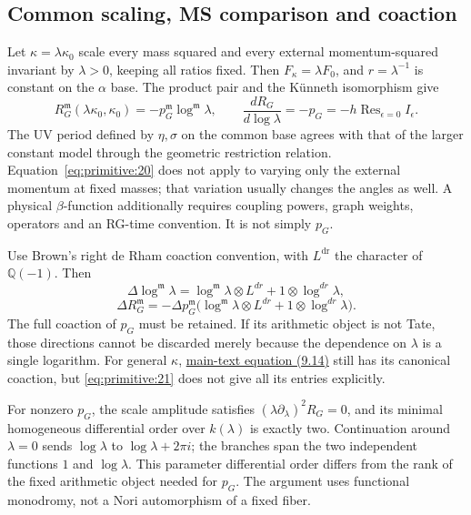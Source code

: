\documentclass[11pt,a4paper,oneside]{article}
\theoremstyle{plain}
\theoremstyle{definition}
\theoremstyle{remark}
\numberwithin{equation}{section}
\newcommand{\otherref}[2]{\href{#1.pdf}{#2}}
\begin{document}
\subsection{Common scaling, MS comparison and coaction}\label{sec:primitive:8}
Let \(\kappa=\lambda\kappa_0\) scale every mass squared and every external momentum-squared invariant by \(\lambda>0\), keeping all ratios fixed. Then \(F_\kappa=\lambda F_0\), and \(r=\lambda^{-1}\) is constant on the \(\alpha\) base. The product pair and the K\"unneth isomorphism give
\begin{equation}
R_G^{\mathfrak m}(\lambda\kappa_0,\kappa_0)
                       =-p_G^{\mathfrak m}\log^{\mathfrak m}\lambda,
 \qquad \frac{dR_G}{d\log\lambda}=-p_G
                         =-h\operatorname{Res}_{\epsilon=0}I_\epsilon.      \label{eq:primitive:20}
\end{equation}
The UV period defined by \(\eta,\sigma\) on the common base agrees with that of the larger constant model through the geometric restriction relation. Equation~\eqref{eq:primitive:20} does not apply to varying only the external momentum at fixed masses; that variation usually changes the angles as well. A physical \(\beta\)-function additionally requires coupling powers, graph weights, operators and an RG-time convention. It is not simply \(p_G\).

Use Brown's right de Rham coaction convention\cite{brownperiods}, with \(L^{\mathrm{dr}}\) the character of $\mathbb Q(-1)$. Then
\begin{equation}
\Delta\log^{\mathfrak m}\lambda
   =\log^{\mathfrak m}\lambda\otimes L^{dr}
                         +1\otimes\log^{dr}\lambda,
\end{equation}
\begin{equation}
\Delta R_G^{\mathfrak m}
  =-\Delta p_G^{\mathfrak m}
       \big(\log^{\mathfrak m}\lambda\otimes L^{dr}
                              +1\otimes\log^{dr}\lambda\big).              \label{eq:primitive:21}
\end{equation}
The full coaction of \(p_G\) must be retained. If its arithmetic object is not Tate, those directions cannot be discarded merely because the dependence on \(\lambda\) is a single logarithm. For general \(\kappa\), \otherref{feynman_periods_long_paper_en}{main-text equation (9.14)} still has its canonical coaction, but \eqref{eq:primitive:21} does not give all its entries explicitly.

For nonzero \(p_G\), the scale amplitude satisfies \((\lambda\partial_\lambda)^2R_G=0\), and its minimal homogeneous differential order over \(k(\lambda)\) is exactly two. Continuation around \(\lambda=0\) sends $\log\lambda$ to $\log\lambda+2\pi i$; the branches span the two independent functions $1$ and $\log\lambda$. This parameter differential order differs from the rank of the fixed arithmetic object needed for \(p_G\). The argument uses functional monodromy, not a Nori automorphism of a fixed fiber.
\end{document}
